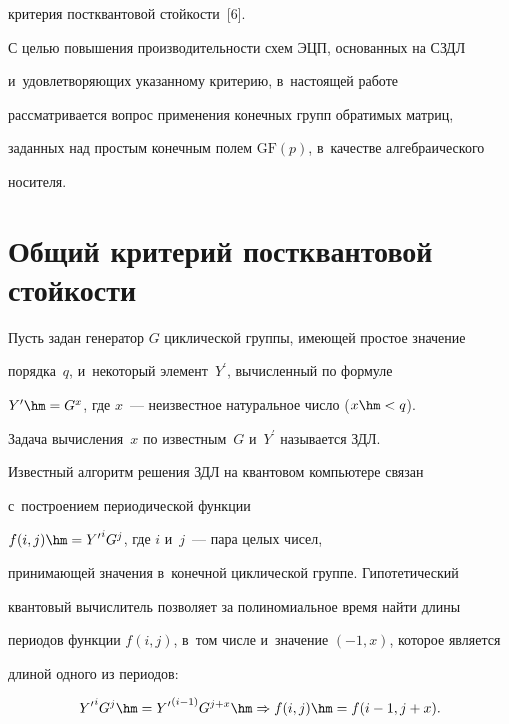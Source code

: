 критерия пост\-кван\-то\-вой стой\-кости~[6].


  


  С целью повышения производительности схем ЭЦП, основанных на СЗДЛ 


и~удовле\-тво\-ря\-ющих указанному критерию, в~настоящей работе 


рас\-смат\-ри\-ва\-ет\-ся вопрос применения конечных групп обратимых мат\-риц, 


заданных над простым конечным полем $\mathrm{GF}(p)$, в~качестве алгебраического 


носителя.


  


\section{Общий критерий постквантовой стойкости}





   Пусть задан генератор $G$ циклической группы, имеющей простое значение 


порядка~$q$, и~некоторый элемент~$Y^\prime$, вычисленный по формуле 


$Y^\prime\hm= G^x$, где $x$~--- неизвестное натуральное чис\-ло ($x\hm< q$). 


Задача вычисления~$x$ по известным~$G$ и~$Y^\prime$ называется ЗДЛ. 


Известный алгоритм решения ЗДЛ на квантовом компьютере связан 


с~по\-стро\-ени\-ем периодической функции 


   $f(i,j)\hm={Y^{\prime}}^iG^j$, где $i$ и~$j$~--- пара целых чисел, 


принимающей значения в~конечной циклической группе. Гипотетический 


квантовый вы\-чис\-ли\-тель позволяет за полиномиальное время найти длины 


периодов функции $f(i,j)$, в~том чис\-ле и~значение $(-1, x)$, которое является 


длиной одного из периодов:  


$$


{Y^\prime}^iG^j\hm= {Y^\prime}^{(i-1)} 


G^{j+x}\hm\Rightarrow f(i,j)\hm= f(i-1, j+x). 


$$


   


